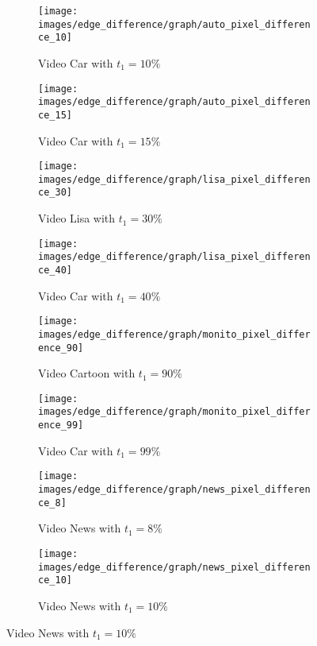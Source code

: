 \documentclass[journal]{IEEEtran}
\begin{document}
\begin{figure}
	\centering
	\begin{subfigure}{0.23\textwidth}
		\centering
		\texttt{[image: images/edge\_difference/graph/auto\_pixel\_difference\_10]} 
		\caption{Video Car with $t_1 = 10\%$}
		\label{fig:edge_difference:graph:car_10} 
	\end{subfigure}
	\centering
	\begin{subfigure}{0.23\textwidth}
		\centering
		\texttt{[image: images/edge\_difference/graph/auto\_pixel\_difference\_15]} 
		\caption{Video Car with $t_1 = 15\%$}
		\label{fig:edge_difference:graph:car_15} 
	\end{subfigure}

	\centering
	\begin{subfigure}{0.23\textwidth}
		\centering
		\texttt{[image: images/edge\_difference/graph/lisa\_pixel\_difference\_30]} 
		\caption{Video Lisa with $t_1 = 30\%$}
		\label{fig:edge_difference:graph:lisa_30} 
	\end{subfigure}
	\centering
	\begin{subfigure}{0.23\textwidth}
		\centering
		\texttt{[image: images/edge\_difference/graph/lisa\_pixel\_difference\_40]} 
		\caption{Video Car with $t_1 = 40\%$}
		\label{fig:edge_difference:graph:lisa_40} 
	\end{subfigure}

	\centering
	\begin{subfigure}{0.23\textwidth}
		\centering
		\texttt{[image: images/edge\_difference/graph/monito\_pixel\_difference\_90]} 
		\caption{Video Cartoon with $t_1 = 90\%$}
		\label{fig:edge_difference:graph:cartoon_90} 
	\end{subfigure}
	\centering
	\begin{subfigure}{0.23\textwidth}
		\centering
		\texttt{[image: images/edge\_difference/graph/monito\_pixel\_difference\_99]} 
		\caption{Video Car with $t_1 = 99\%$}
		\label{fig:edge_difference:graph:cartoon_99} 
	\end{subfigure}

	
	\centering
	\begin{subfigure}{0.23\textwidth}
		\centering
		\texttt{[image: images/edge\_difference/graph/news\_pixel\_difference\_8]} 
		\caption{Video News with $t_1 = 8\%$}
		\label{fig:edge_difference:graph:news_8} 
	\end{subfigure}
	\centering
	\begin{subfigure}{0.23\textwidth}
		\centering
		\texttt{[image: images/edge\_difference/graph/news\_pixel\_difference\_10]} 
		\caption{Video News with $t_1 = 10\%$}
		\label{fig:edge_difference:graph:news_10} 
	\end{subfigure}


\end{figure}
\end{document}

